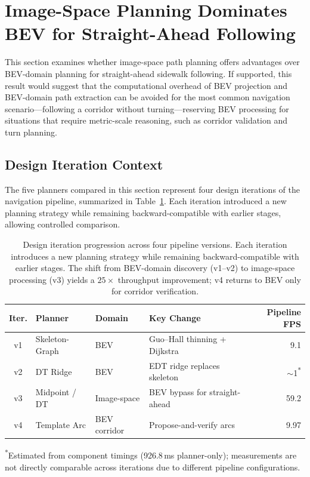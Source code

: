 \documentclass[12pt,letterpaper,oneside]{report}
\begin{document}
\section{Image-Space Planning Dominates BEV for Straight-Ahead Following}
\label{sec:claim_planning_domain}
\label{sec:planner_comparison}

This section examines whether image-space path planning offers advantages over BEV-domain planning for straight-ahead sidewalk following.  If supported, this result would suggest that the computational overhead of BEV projection and BEV-domain path extraction can be avoided for the most common navigation scenario---following a corridor without turning---reserving BEV processing for situations that require metric-scale reasoning, such as corridor validation and turn planning.

\subsection{Design Iteration Context}

The five planners compared in this section represent four design iterations of the navigation pipeline, summarized in Table~\ref{tab:iteration_progression}.  Each iteration introduced a new planning strategy while remaining backward-compatible with earlier stages, allowing controlled comparison.

\begin{table}[h]
\centering
\caption{Design iteration progression across four pipeline versions. Each iteration introduces a new planning strategy while remaining backward-compatible with earlier stages. The shift from BEV-domain discovery (v1--v2) to image-space processing (v3) yields a $25\times$ throughput improvement; v4 returns to BEV only for corridor verification.}
\label{tab:iteration_progression}
\begin{tabular}{clllr}
\toprule
Iter. & Planner & Domain & Key Change & Pipeline FPS \\
\midrule
v1 & Skeleton-Graph & BEV & Guo--Hall thinning + Dijkstra & 9.1 \\
v2 & DT Ridge & BEV & EDT ridge replaces skeleton & ${\sim}$1\textsuperscript{*} \\
v3 & Midpoint / DT & Image-space & BEV bypass for straight-ahead & 59.2 \\
v4 & Template Arc & BEV corridor & Propose-and-verify arcs & 9.97 \\
\bottomrule
\end{tabular}
\begin{flushleft}
\footnotesize\textsuperscript{*}Estimated from component timings (926.8\,ms planner-only); measurements are not directly comparable across iterations due to different pipeline configurations.
\end{flushleft}
\end{table}
\end{document}
